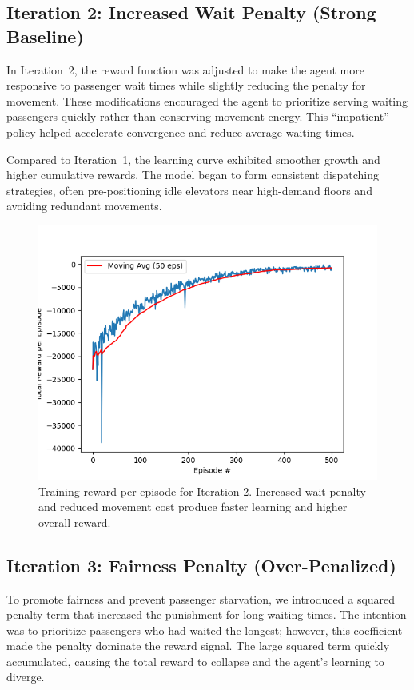 \documentclass[conference]{IEEEtran}
\begin{document}
\subsection{Iteration 2: Increased Wait Penalty (Strong Baseline)}
In Iteration~2, the reward function was adjusted to make the agent more responsive to passenger wait times while slightly reducing the penalty for movement.
These modifications encouraged the agent to prioritize serving waiting passengers quickly rather than conserving movement energy. This “impatient” policy helped accelerate convergence and reduce average waiting times.

Compared to Iteration~1, the learning curve exhibited smoother growth and higher cumulative rewards. The model began to form consistent dispatching strategies, often pre-positioning idle elevators near high-demand floors and avoiding redundant movements.

\begin{figure}[H]
\centering
\includegraphics[width=\columnwidth]{2_total_reward_per_episode.png}
\caption{Training reward per episode for Iteration 2. Increased wait penalty and reduced movement cost produce faster learning and higher overall reward.}
\label{fig:iter2}
\end{figure}


\subsection{Iteration 3: Fairness Penalty (Over-Penalized)}
To promote fairness and prevent passenger starvation, we introduced a squared penalty term that increased the punishment for long waiting times.
The intention was to prioritize passengers who had waited the longest; however, this coefficient made the penalty dominate the reward signal. The large squared term quickly accumulated, causing the total reward to collapse and the agent’s learning to diverge.
\end{document}
